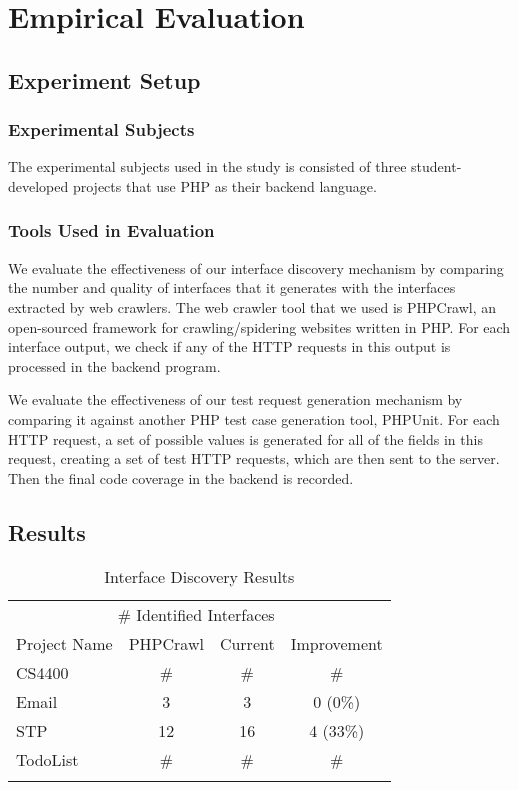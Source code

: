 \chapter{Empirical Evaluation}

\section{Experiment Setup}
\subsection{Experimental Subjects}
The experimental subjects used in the study is consisted of three student-developed projects that use PHP as their backend language.

\subsection{Tools Used in Evaluation}
We evaluate the effectiveness of our interface discovery mechanism by comparing the number and quality of interfaces that it generates with the interfaces extracted by web crawlers. The web crawler tool that we used is PHPCrawl, an open-sourced framework for crawling/spidering websites written in PHP. For each interface output, we check if any of the HTTP requests in this output is processed in the backend program.

We evaluate the effectiveness of our test request generation mechanism by comparing it against another PHP test case generation tool, PHPUnit. For each HTTP request, a set of possible values is generated for all of the fields in this request, creating a set of test HTTP requests, which are then sent to the server. Then the final code coverage in the backend is recorded.

\section{Results}
\begin{table}
\caption{Interface Discovery Results}
\begin{center}
\begin{tabular}{lccc}

\toprule
\multicolumn{3}{r}{\# Identified Interfaces} \\
\cmidrule(r){2-3}
Project Name & PHPCrawl & Current & Improvement \\
\midrule
CS4400		& \# 	& \# 	& \# 		\\
Email 		& 3 	& 3 	& 0 (0\%) 	\\
STP 		& 12 	& 16 	& 4 (33\%) 	\\
TodoList 	& \# 	& \# 	& \# 		\\
\bottomrule

\label{Interface Discovery Results}
\end{tabular}
\end{center}
\end{table}

